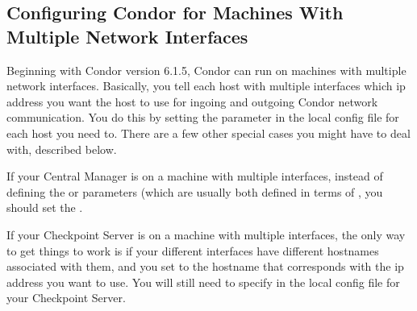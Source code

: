\subsection{\label{sec:Multiple-Interfaces}Configuring Condor for
Machines With Multiple Network Interfaces } 

Beginning with Condor version 6.1.5, Condor can run on machines with
multiple network interfaces.
Basically, you tell each host with multiple interfaces which ip
address you want the host to use for ingoing and outgoing Condor
network communication.
You do this by setting the  parameter in
the local config file for each host you need to.
There are a few other special cases you might have to deal with,
described below.

If your Central Manager is on a machine with multiple interfaces,
instead of defining the  or
 parameters (which are usually both defined in
terms of , you should set the . 

If your Checkpoint Server is on a machine with multiple interfaces,
the only way to get things to work is if your different interfaces
have different hostnames associated with them, and you set
 to the hostname that corresponds with the
ip address you want to use.  
You will still need to specify  in the local
config file for your Checkpoint Server.
